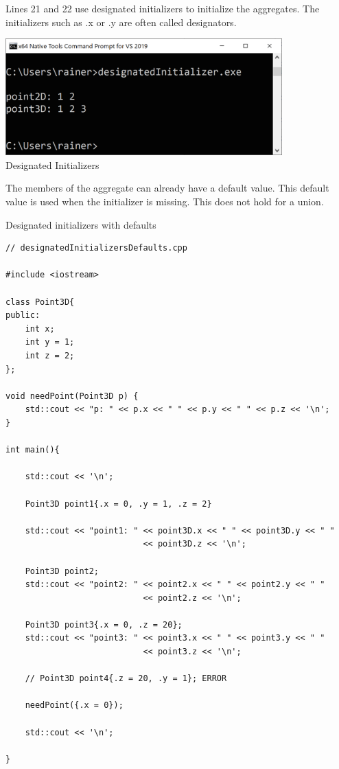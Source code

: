 Lines 21 and 22 use designated initializers to initialize the aggregates. The initializers such as .x or .y are often called designators.

\begin{center}
\includegraphics[width=0.8\textwidth]{content/3/chapter4/images/33.png}\\
Designated Initializers
\end{center}

The members of the aggregate can already have a default value. This default value is used when the initializer is missing. This does not hold for a union.

\noindent
Designated initializers with defaults
\begin{lstlisting}[style=styleCXX]
// designatedInitializersDefaults.cpp

#include <iostream>

class Point3D{
public:
	int x;
	int y = 1;
	int z = 2;
};

void needPoint(Point3D p) {
	std::cout << "p: " << p.x << " " << p.y << " " << p.z << '\n';
}

int main(){
	
	std::cout << '\n';
	
	Point3D point1{.x = 0, .y = 1, .z = 2}
	
	std::cout << "point1: " << point3D.x << " " << point3D.y << " "
							<< point3D.z << '\n';
							 
	Point3D point2;		 
	std::cout << "point2: " << point2.x << " " << point2.y << " "
							<< point2.z << '\n';
				
    Point3D point3{.x = 0, .z = 20};			 
	std::cout << "point3: " << point3.x << " " << point3.y << " "
							<< point3.z << '\n';
	
	// Point3D point4{.z = 20, .y = 1}; ERROR
	
	needPoint({.x = 0});
	
	std::cout << '\n';
	
}
\end{lstlisting}

